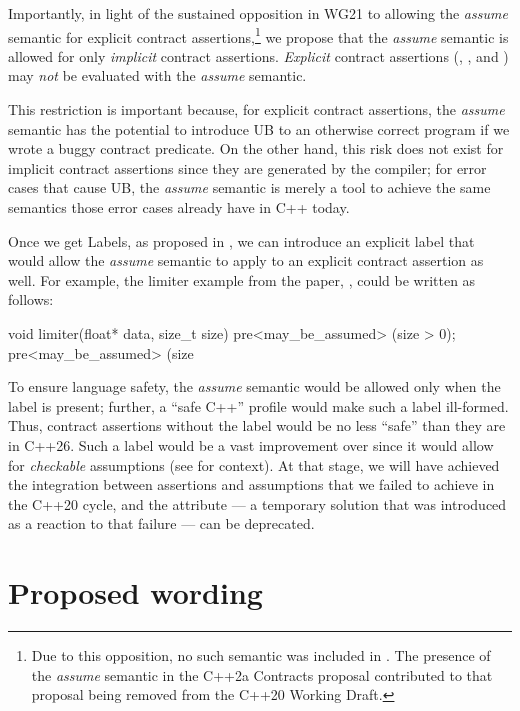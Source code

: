 Importantly, in light of the sustained opposition in WG21 to allowing the \emph{assume} semantic for explicit contract assertions,\footnote{Due to this opposition, no such semantic was included in \cite{P2900R14}. The presence of the \emph{assume} semantic in the C++2a Contracts proposal \cite{P0542R5} contributed to that proposal being removed from the C++20 Working Draft.} we propose that the \emph{assume} semantic is allowed for only \emph{implicit} contract assertions. \emph{Explicit} contract assertions (, , and ) may \emph{not} be evaluated with the \emph{assume} semantic.

This restriction is important because, for explicit contract assertions, the \emph{assume} semantic  has the potential to introduce UB to an otherwise correct program if we wrote a buggy contract predicate. On the other hand, this risk does not exist for implicit contract assertions since they are generated by the compiler; for error cases that cause UB, the \emph{assume} semantic is merely a tool to achieve the same semantics those error cases already have in C++ today.

Once we get Labels, as proposed in \cite{P3400R1}, we can introduce an explicit label that would allow the \emph{assume} semantic to apply to an explicit contract assertion as well. For example, the limiter example from the \tcode{[[assume]]} paper, \cite{P1774R8}, could be written as follows:
\begin{codeblock}
void limiter(float* data, size_t size)
  pre<may_be_assumed> (size > 0);
  pre<may_be_assumed> (size %
\end{codeblock}
To ensure language safety, the \emph{assume} semantic would be allowed only when the \mbox{} label is present; further, a ``safe C++'' profile would make such a label ill-formed. Thus, contract assertions without the label would be no less ``safe'' than they are in C++26. Such a label would be a vast improvement over \tcode{[[assume]]} since it would allow for \emph{checkable} assumptions (see \cite{P2064R0} for context). At that stage, we will have achieved the integration between assertions and assumptions that we failed to achieve in the C++20 cycle, and the \tcode{[[assume]]} attribute --- a temporary solution that was introduced as a reaction to that failure --- can be deprecated.

\section{Proposed wording}
\label{wording}

